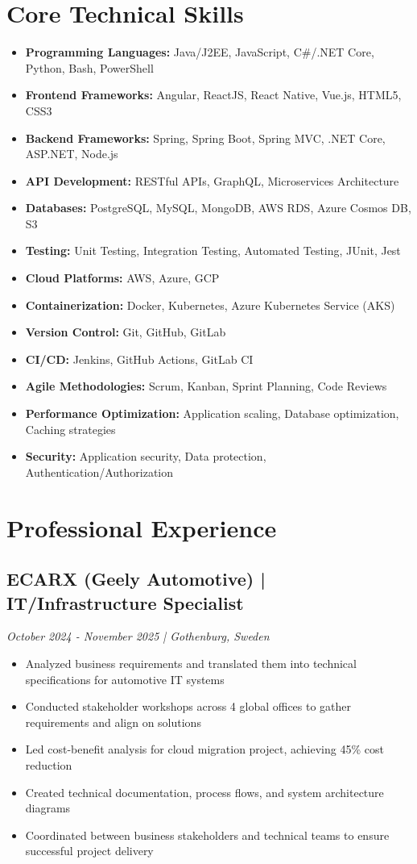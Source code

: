 \documentclass[11pt,a4paper]{article}
\begin{document}
\section*{Core Technical Skills}
\begin{itemize}[noitemsep]
\item \textbf{Programming Languages:} Java/J2EE, JavaScript, C\#/.NET Core, Python, Bash, PowerShell
\item \textbf{Frontend Frameworks:} Angular, ReactJS, React Native, Vue.js, HTML5, CSS3
\item \textbf{Backend Frameworks:} Spring, Spring Boot, Spring MVC, .NET Core, ASP.NET, Node.js
\item \textbf{API Development:} RESTful APIs, GraphQL, Microservices Architecture
\item \textbf{Databases:} PostgreSQL, MySQL, MongoDB, AWS RDS, Azure Cosmos DB, S3
\item \textbf{Testing:} Unit Testing, Integration Testing, Automated Testing, JUnit, Jest
\item \textbf{Cloud Platforms:} AWS, Azure, GCP
\item \textbf{Containerization:} Docker, Kubernetes, Azure Kubernetes Service (AKS)
\item \textbf{Version Control:} Git, GitHub, GitLab
\item \textbf{CI/CD:} Jenkins, GitHub Actions, GitLab CI
\item \textbf{Agile Methodologies:} Scrum, Kanban, Sprint Planning, Code Reviews
\item \textbf{Performance Optimization:} Application scaling, Database optimization, Caching strategies
\item \textbf{Security:} Application security, Data protection, Authentication/Authorization
\end{itemize}

\section*{Professional Experience}
\subsection*{ECARX (Geely Automotive) | IT/Infrastructure Specialist}
\textit{October 2024 - November 2025 | Gothenburg, Sweden}
\begin{itemize}[noitemsep]
\item Analyzed business requirements and translated them into technical specifications for automotive IT systems
\item Conducted stakeholder workshops across 4 global offices to gather requirements and align on solutions
\item Led cost-benefit analysis for cloud migration project, achieving 45\% cost reduction
\item Created technical documentation, process flows, and system architecture diagrams
\item Coordinated between business stakeholders and technical teams to ensure successful project delivery
\end{itemize}
\end{document}
